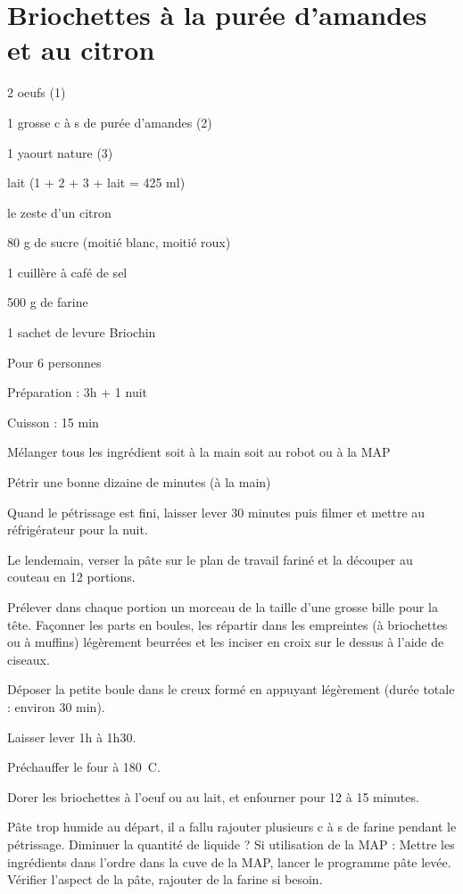 \section[\normalsize{Briochettes \`a la pur\'ee d'amandes et au citron}]{Briochettes \`a la pur\'ee d'amandes et au citron}

\begin{ingredients}
\item 2 oeufs (1)
\item 1 grosse c \`a s de pur\'ee d'amandes (2)
\item 1 yaourt nature (3)
\item lait (1 + 2 + 3 + lait = 425 ml)
\item le zeste d'un citron
\item 80 g de sucre (moiti\'e blanc, moiti\'e roux)
\item 1 cuill\`ere \`a caf\'e de sel
\item 500 g de farine
\item 1 sachet de levure Briochin 
\end{ingredients}
\begin{infos}
\item Pour 6 personnes
\item Préparation : 3h + 1 nuit
\item Cuisson : 15 min
\end{infos}
\begin{etapes}
\item Mélanger tous les ingrédient soit à la main soit au robot ou à la MAP
\item Pétrir une bonne dizaine de minutes (à la main)
\item Quand le p\'etrissage est fini, laisser lever 30 minutes puis filmer et mettre au r\'efrig\'erateur pour la nuit.
\item Le lendemain, verser la p\^ate sur le plan de travail farin\'e et la d\'ecouper au couteau en 12 portions. 
\item Pr\'elever dans chaque portion un morceau de la taille d'une grosse bille pour la t\^ete. Façonner les parts en boules, les r\'epartir dans les empreintes (\`a briochettes ou \`a muffins) l\'eg\`erement beurr\'ees et les inciser en croix sur le dessus \`a l'aide de ciseaux. \item D\'eposer la petite boule dans le creux form\'e en appuyant l\'eg\`erement (dur\'ee totale : environ 30 min). 
\item Laisser lever 1h \`a 1h30.
\item Pr\'echauffer le four \`a 180\ C. 
\item Dorer les briochettes \`a l'oeuf ou au lait, et enfourner pour 12 \`a 15 minutes.
\end{etapes}
\begin{conseils}
P\^ate trop humide au d\'epart, il a fallu rajouter plusieurs c \`a s de farine pendant le p\'etrissage. Diminuer la quantit\'e de liquide ?
Si utilisation de la MAP : Mettre les ingr\'edients dans l'ordre dans la cuve de la MAP, lancer le programme p\^ate lev\'ee. V\'erifier l'aspect de la p\^ate, rajouter de la farine si besoin. 
\end{conseils}

